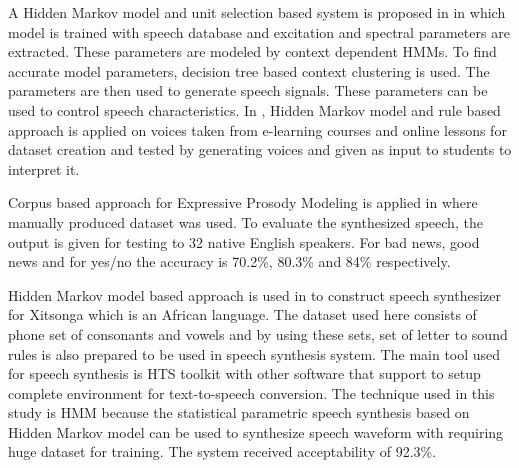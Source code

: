 A Hidden Markov model and unit selection based system is proposed in \cite{tokuda2002hmm} in which model is trained with speech database and excitation and spectral parameters are extracted. These parameters are modeled by context dependent HMMs. To find
accurate model parameters, decision tree based context clustering is used. The parameters are then used to generate speech
signals. These parameters can be used to control speech characteristics. In \cite{harashima2006review}, Hidden Markov model and rule based approach is applied 
on voices taken from e-learning courses and online lessons for dataset creation and tested by
generating voices and given as input to students to interpret it.

Corpus based approach for Expressive Prosody Modeling is applied in \cite{eide2004corpus} where 
manually produced dataset was used. To evaluate the synthesized
speech, the output is given for testing to 32 native English speakers. For bad news, good news and
for yes/no the accuracy is 70.2\%, 80.3\% and 84\% respectively.


Hidden Markov model based approach is used in \cite{baloyi2012text} to construct
speech synthesizer for Xitsonga which is an African language. The dataset used here consists of phone
set of consonants and vowels and by using these sets, set of letter to sound rules is also prepared to be used in speech synthesis system. The main tool used for speech synthesis is HTS toolkit \cite{hts_2.2} with other software that support to setup complete environment for text-to-speech conversion.
The technique used in this study is HMM because the statistical parametric speech synthesis based on Hidden Markov model
can be used to synthesize speech waveform with requiring huge dataset for training. The system received acceptability
of 92.3\%. 

